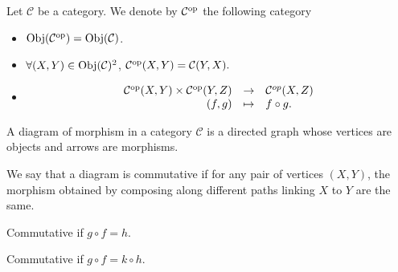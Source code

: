 \begin{definitionenv}
    Let $\mathcal{C}$ be a category. We denote by $\mathcal{C}^{\mathrm{op}}$ the following category
    \begin{itemize}
        \item $\operatorname{\mathrm{Obj}}(\mathcal{C}^{\mathrm{op}}) = \operatorname{\mathrm{Obj}}(\mathcal{C})$.
        \item $\forall (X,Y)\in \operatorname{\mathrm{Obj}}(\mathcal{C})^2$, $\mathcal{C}^{\mathrm{op}}(X,Y) = \mathcal{C}(Y,X).$
        \item $$\begin{array}{rcl}
            \mathcal{C}^{\mathrm{op}}(X,Y)\times \mathcal{C}^{\mathrm{op}}(Y,Z)&\rightarrow&\mathcal{C}^{op}(X,Z)\\
            (f,g)&\mapsto&f\circ g.
        \end{array}$$
    \end{itemize}
        \begin{center}
\end{center}
\end{definitionenv}
\begin{definitionenv}
    A diagram of morphism in a category $\mathcal{C}$ is a directed graph whose vertices are objects and arrows are morphisms.

    \quad We say that a diagram is commutative if for any pair of vertices $(X,Y)$, the morphism obtained by composing along different paths linking $X$ to $Y$ are the same.
\end{definitionenv}
\begin{exampleenv}
    \quad \newline
    Commutative if $g\circ f =h$.
    \begin{center}
\end{center}
Commutative if $g\circ f =k\circ h$.
    \begin{center}
\end{center}
\end{exampleenv}
\newpage
